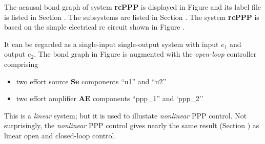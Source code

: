 

The acausal bond graph of system \textbf{rcPPP} is
displayed in Figure  and its label
file is listed in Section .
The subsystems are listed in Section .
The system \textbf{rcPPP} is based on the simple electrical rc circuit shown in
Figure . 

It can be regarded as a single-input
single-output system with input $e_1$ and output $e_2$.
The bond graph in Figure  is augmented with the {\em
open-loop\/} controller comprising
\begin{itemize}
\item two effort source \textbf{Se} components ``u1'' and ``u2''
\item two effort amplifier \textbf{AE} components ``ppp\_1'' and `ppp\_2''
\end{itemize}

This is a \emph{linear} system; but it is used to illustate
\emph{nonlinear} PPP control. Not surprisingly, the \emph{nonlinear}
PPP control gives nearly the same result (Section )
as linear open and closed-loop control.





